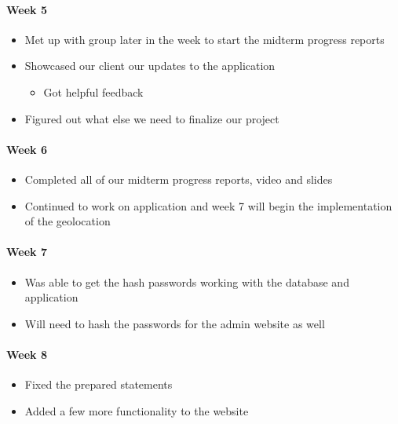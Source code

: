 \documentclass[onecolumn, draftclsnofoot,10pt, compsoc]{IEEEtran}
\begin{document}
      \paragraph{Week 5}
        \begin{itemize}
          \item Met up with group later in the week to start the midterm progress reports
          \item Showcased our client our updates to the application
            \begin{itemize}
              \item Got helpful feedback
            \end{itemize}
          \item Figured out what else we need to finalize our project
        \end{itemize}

      \paragraph{Week 6}
        \begin{itemize}
          \item Completed all of our midterm progress reports, video and slides
          \item Continued to work on application and week 7 will begin the implementation of the geolocation
        \end{itemize}

      \paragraph{Week 7}
        \begin{itemize}
          \item Was able to get the hash passwords working with the database and application
          \item Will need to hash the passwords for the admin website as well
        \end{itemize}

      \paragraph{Week 8}
        \begin{itemize}
          \item Fixed the prepared statements
          \item Added a few more functionality to the website
        \end{itemize}
\end{document}
